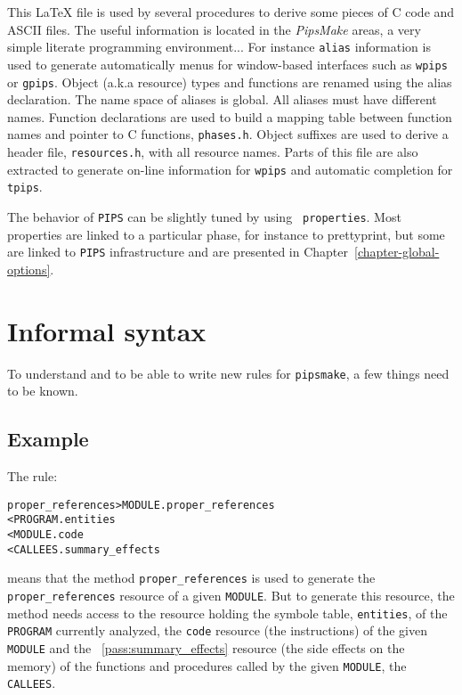 \documentclass[a4paper]{report}
\newcommand{\PipsPassRef}[1]{\texttt{\detokenize{#1}}~\ref{pass:#1}}
\begin{document}
This \LaTeX{} file is used by several procedures to derive some pieces
of C code and ASCII files. The useful information is located in the
{\em PipsMake} areas, a very simple literate programming
environment... For instance \verb+alias+ information is used to
generate automatically menus for window-based interfaces such as
\verb+wpips+ or \verb+gpips+. Object (a.k.a resource) types and
functions are renamed using the alias declaration. The name space of
aliases is global. All aliases must have different names. Function
declarations are used to build a mapping table between function names
and pointer to C functions, \texttt{phases.h}. Object suffixes are
used to derive a header file, {\tt resources.h}, with all resource
names. Parts of this file are also extracted to generate on-line
information for {\tt wpips} and automatic completion for {\tt tpips}.

The behavior of {\tt PIPS} can be slightly tuned by using {\tt
  properties}. Most properties are linked to a particular phase, for
instance to prettyprint, but some are linked to {\tt PIPS}
infrastructure and are presented in
Chapter~\ref{chapter-global-options}.

\section{Informal syntax}
\label{sec:informal-syntax}

To understand and to be able to write new rules for {\tt pipsmake}, a
few things need to be known.

\subsection{Example}
\label{sec:example}

The rule:

\begin{alltt}
proper_references       > MODULE.proper_references
        < PROGRAM.entities
        < MODULE.code
        < CALLEES.summary_effects
\end{alltt}
means that the method \verb|proper_references| is used to generate the
\verb|proper_references| resource of a given \texttt{MODULE}. But to
generate this resource, the method needs access to the resource holding
the symbole table, \texttt{entities}, of the \texttt{PROGRAM} currently
analyzed, the \texttt{code} resource (the instructions) of the given
\texttt{MODULE} and the \PipsPassRef{summary_effects} resource (the side effects
on the memory) of the functions and procedures called by the given
\texttt{MODULE}, the \texttt{CALLEES}.
\end{document}
